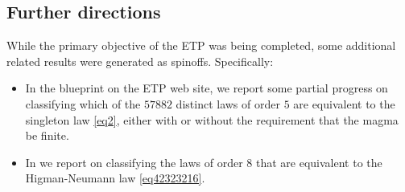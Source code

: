 \subsection{Further directions}

While the primary objective of the ETP was being completed, some additional related results were generated as spinoffs.  Specifically:
\begin{itemize}
\item In the blueprint on the ETP web site, we report some partial progress on classifying which of the $57882$ distinct laws of order $5$ are equivalent to the singleton law \eqref{eq2}, either with or without the requirement that the magma be finite.
\item In  we report on classifying the laws of order $8$ that are equivalent to the Higman-Neumann law \eqref{eq42323216}.
\end{itemize}
